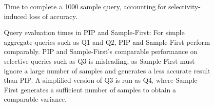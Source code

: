 

\begin{figure}
\begin{center}
\caption{Time to complete a 1000 sample query, accounting for selectivity-induced loss of accuracy.}
\label{fig:scaling_selectivity}
\end{center}
\end{figure}


\begin{figure}
\begin{center}
\caption{Query evaluation times in PIP and Sample-First: For simple aggregate queries such as Q1 and Q2, PIP and Sample-First perform comparably.  PIP and Sample-First's comparable performance on selective queries such as Q3 is misleading, as Sample-First must ignore a large number of samples and generates a less accurate result than PIP.  A simplified version of Q3 is run as Q4, where Sample-First generates a sufficient number of samples to obtain a comparable variance.}
\label{fig:querytimings}
\end{center}
\end{figure}

